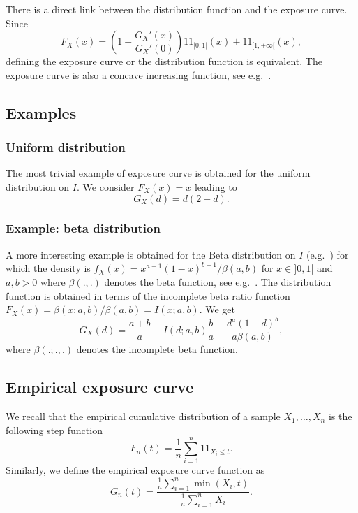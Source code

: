 \documentclass[article, nojss]{jss}
\newcommand{\ind}{1\!\!1}
\begin{document}
There is a direct link between the distribution function and the exposure curve.
Since 
$$
F_X(x) = \left(1- \frac{G_X'(x)}{G_X'(0)}\right)\ind_{[0,1[}(x) + \ind_{[1,+\infty[}(x),
$$
defining the exposure curve or the distribution function is equivalent.
The exposure curve is also a concave increasing function, see e.g.~\cite{antal03}.

\subsection{Examples}

\subsubsection{Uniform distribution}
\label{sec:unif}

The most trivial example of exposure curve is obtained for the uniform distribution on $I$.
We consider $F_X(x)=x$ leading to
$$
G_X(d) 
= d(2-d).
$$

\subsubsection{Example: beta distribution}
\label{sec:beta}

A more interesting example is obtained for the Beta distribution on $I$ 
(e.g.~\cite{kotzjohnsonbalak94v2})
for which the density is $f_X(x) = x^{a-1}(1-x)^{b-1}/\beta(a,b)$ for $x\in ]0,1[$ and $a,b>0$
where $\beta(.,.)$ denotes the 
beta function, see e.g.~\cite{nist10}.
The distribution function is obtained in terms of the incomplete beta ratio function 
$F_X(x) = \beta(x;a,b)/\beta(a,b) = I(x;a,b)$.
We get
$$
G_X(d) %
= \frac{a+b}{a} - I(d;a,b) \frac{b}{a} - \frac{d^a(1-d)^b}{a\beta(a,b)},
$$
where $\beta(.;.,.)$ denotes the incomplete beta function.



\subsection{Empirical exposure curve}
We recall that the empirical cumulative distribution of a sample $X_1,\dots, X_n$ is 
the following step function
$$
F_n(t) = \frac{1}{n} \sum_{i=1}^n \ind_{X_i\leq t}.
$$
Similarly, we define the empirical exposure curve function as
$$
G_n(t) = \frac{\frac{1}{n} \sum_{i=1}^n \min(X_i, t)}{\frac{1}{n} \sum_{i=1}^n X_i}.
$$
\end{document}
